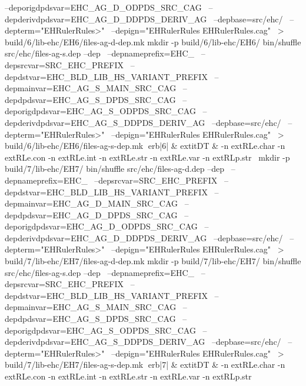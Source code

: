 	  --deporigdpdsvar=EHC_AG_D_ODPDS_SRC_CAG \
	  --depderivdpdsvar=EHC_AG_D_DDPDS_DERIV_AG \
	  --depbase=src/ehc/ \
	  --depterm="EHRulerRules>" \
	  --depign="EHRulerRules EHRulerRules.cag" \
	    > build/6/lib-ehc/EH6/files-ag-d-dep.mk
mkdir -p build/6/lib-ehc/EH6/
bin/shuffle src/ehc/files-ag-s.dep --dep \
	  --depnameprefix=EHC_ \
	  --depsrcvar=SRC_EHC_PREFIX \
	  --depdstvar=EHC_BLD_LIB_HS_VARIANT_PREFIX \
	  --depmainvar=EHC_AG_S_MAIN_SRC_CAG \
	  --depdpdsvar=EHC_AG_S_DPDS_SRC_CAG \
	  --deporigdpdsvar=EHC_AG_S_ODPDS_SRC_CAG \
	  --depderivdpdsvar=EHC_AG_S_DDPDS_DERIV_AG \
	  --depbase=src/ehc/ \
	  --depterm="EHRulerRules>" \
	  --depign="EHRulerRules EHRulerRules.cag" \
	    > build/6/lib-ehc/EH6/files-ag-s-dep.mk
erb|6| & 	extit{DT} & 
-n 	extRL{e.char}\hspace{.5em} 
-n 	extRL{e.con}\hspace{.5em} 
-n 	extRL{e.int}\hspace{.5em} 
-n 	extRL{e.str}\hspace{.5em} 
-n 	extRL{e.var}\hspace{.5em} 
-n 	extRL{p.str}\hspace{.5em} 
\
mkdir -p build/7/lib-ehc/EH7/
bin/shuffle src/ehc/files-ag-d.dep --dep \
	  --depnameprefix=EHC_ \
	  --depsrcvar=SRC_EHC_PREFIX \
	  --depdstvar=EHC_BLD_LIB_HS_VARIANT_PREFIX \
	  --depmainvar=EHC_AG_D_MAIN_SRC_CAG \
	  --depdpdsvar=EHC_AG_D_DPDS_SRC_CAG \
	  --deporigdpdsvar=EHC_AG_D_ODPDS_SRC_CAG \
	  --depderivdpdsvar=EHC_AG_D_DDPDS_DERIV_AG \
	  --depbase=src/ehc/ \
	  --depterm="EHRulerRules>" \
	  --depign="EHRulerRules EHRulerRules.cag" \
	    > build/7/lib-ehc/EH7/files-ag-d-dep.mk
mkdir -p build/7/lib-ehc/EH7/
bin/shuffle src/ehc/files-ag-s.dep --dep \
	  --depnameprefix=EHC_ \
	  --depsrcvar=SRC_EHC_PREFIX \
	  --depdstvar=EHC_BLD_LIB_HS_VARIANT_PREFIX \
	  --depmainvar=EHC_AG_S_MAIN_SRC_CAG \
	  --depdpdsvar=EHC_AG_S_DPDS_SRC_CAG \
	  --deporigdpdsvar=EHC_AG_S_ODPDS_SRC_CAG \
	  --depderivdpdsvar=EHC_AG_S_DDPDS_DERIV_AG \
	  --depbase=src/ehc/ \
	  --depterm="EHRulerRules>" \
	  --depign="EHRulerRules EHRulerRules.cag" \
	    > build/7/lib-ehc/EH7/files-ag-s-dep.mk
erb|7| & 	extit{DT} & 
-n 	extRL{e.char}\hspace{.5em} 
-n 	extRL{e.con}\hspace{.5em} 
-n 	extRL{e.int}\hspace{.5em} 
-n 	extRL{e.str}\hspace{.5em} 
-n 	extRL{e.var}\hspace{.5em} 
-n 	extRL{p.str}\hspace{.5em} 

